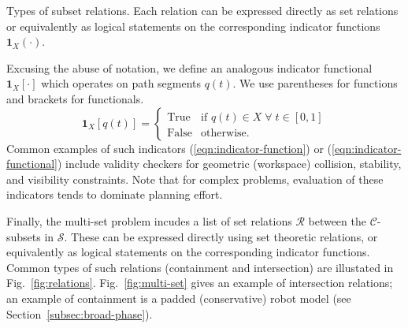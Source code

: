 \begin{marginfigure}
   \centering
   \vspace{-0.05in}
   \vspace{0.1in}
   \caption{Types of subset relations.
     Each relation can be expressed directly as set relations
     or equivalently as logical statements
     on the corresponding indicator functions
     $\mathbf{1}_X(\cdot)$.}
   \label{fig:relations}
\end{marginfigure}

Excusing the abuse of notation,
we define an analogous indicator functional $\mathbf{1}_X[\cdot]$
which operates on path segments $q(t)$.
We use parentheses for functions and brackets for functionals.
\begin{equation}
  \mathbf{1}_X[q(t)] =
    \left\{ \begin{array}{ll}
      \mbox{True} & \mbox{if } q(t) \in X \;\forall\; t \in [0,1] \\
      \mbox{False} & \mbox{otherwise}.
    \end{array} \right.
  \label{eqn:indicator-functional}
\end{equation}
Common examples of such indicators
(\ref{eqn:indicator-function}) or (\ref{eqn:indicator-functional})
include validity checkers for
geometric (workspace) collision,
stability, and visibility constraints.
Note that for complex problems,
evaluation of these indicators 
tends to dominate planning effort.

Finally, the multi-set problem incudes a list of set relations
$\mathcal{R}$
between the $\mathcal{C}$-subsets in $\mathcal{S}$.
These can be expressed directly using set theoretic relations,
or equivalently as logical statements
on the corresponding indicator functions.
Common types of such relations
(containment and intersection)
are illustated in Fig.~\ref{fig:relations}.
Fig.~\ref{fig:multi-set} gives an example of intersection relations;
an example of containment is a padded (conservative)
robot model (see Section~\ref{subsec:broad-phase}).

